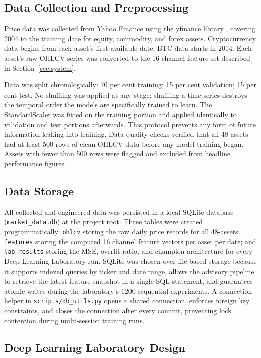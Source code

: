 \documentclass[journal]{IEEEtran}
\begin{document}
\subsection{Data Collection and Preprocessing}

Price data was collected from Yahoo Finance using the yfinance library
\cite{yfinance}, covering 2004 to the training date for equity,
commodity, and forex assets. Cryptocurrency data begins from each
asset's first available date; BTC data starts in 2014. Each asset's raw
OHLCV series was converted to the 16 channel feature set described in
Section~\ref{sec:system}.

Data was split chronologically: 70 per cent training; 15 per cent
validation; 15 per cent test. No shuffling was applied at any stage;
shuffling a time series destroys the temporal order the models are
specifically trained to learn. The StandardScaler was fitted on the
training portion and applied identically to validation and test portions
afterwards. This protocol prevents any form of future information leaking
into training. Data quality checks verified that all 48-assets had at
least 500 rows of clean OHLCV data before any model training began.
Assets with fewer than 500 rows were flagged and excluded from headline
performance figures.

\subsection{Data Storage}

All collected and engineered data was persisted in a local SQLite
database (\texttt{market\_data.db}) at the project root. Three tables
were created programmatically: \texttt{ohlcv} storing the raw daily
price records for all 48-assets; \texttt{features} storing the computed
16 channel feature vectors per asset per date; and
\texttt{lab\_results} storing the MSE, overfit ratio, and champion
architecture for every Deep Learning Laboratory run. SQLite was chosen
over file-based storage because it supports indexed queries by ticker
and date range, allows the advisory pipeline to retrieve the latest
feature snapshot in a single SQL statement, and guarantees atomic
writes during the laboratory's 1200 sequential experiments. A
connection helper in \texttt{scripts/db\_utils.py} opens a shared
connection, enforces foreign key constraints, and closes the connection
after every commit, preventing lock contention during multi-session
training runs.

\subsection{Deep Learning Laboratory Design}
\end{document}

